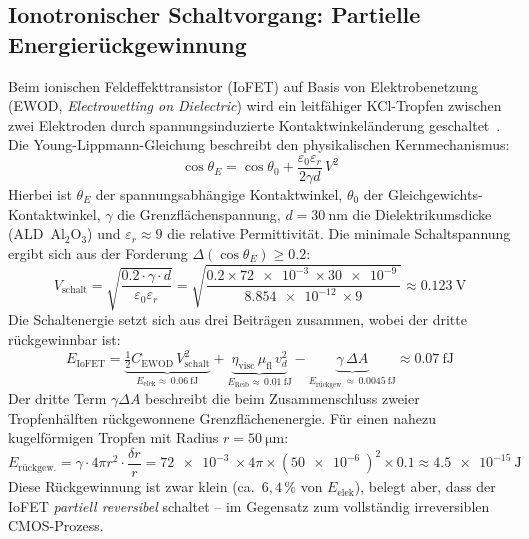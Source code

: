 ﻿\documentclass[12pt, a4paper]{report}
\theoremstyle{definition}
\theoremstyle{remark}
\begin{document}
\subsection{Ionotronischer Schaltvorgang: Partielle Energierückgewinnung}

Beim ionischen Feldeffekttransistor (IoFET) auf Basis von Elektrobenetzung
(EWOD, \emph{Electrowetting on Dielectric}) wird ein leitfähiger
KCl-Tropfen zwischen zwei Elektroden durch spannungsinduzierte
Kontaktwinkeländerung geschaltet~\cite{ionotronik2026}.
Die Young-Lippmann-Gleichung beschreibt den physikalischen Kernmechanismus:
\begin{equation}
  \cos\theta_E = \cos\theta_0
  + \frac{\varepsilon_0 \varepsilon_r}{2 \gamma d}\, V^2
  \label{eq:young_lippmann_thermo}
\end{equation}
Hierbei ist $\theta_E$ der spannungsabhängige Kontaktwinkel, $\theta_0$
der Gleichgewichts-Kontaktwinkel, $\gamma$ die Grenzflächenspannung,
$d = \SI{30}{\nano\metre}$ die Dielektrikumsdicke (ALD~Al$_2$O$_3$)
und $\varepsilon_r \approx 9$ die relative Permittivität.
Die minimale Schaltspannung ergibt sich aus der Forderung
$\Delta(\cos\theta_E) \geq 0.2$:
\begin{equation}
  V_\text{schalt}
  = \sqrt{\frac{0.2 \cdot \gamma \cdot d}{\varepsilon_0 \varepsilon_r}}
  = \sqrt{\frac{0.2 \times \SI{72e-3}{} \times \SI{30e-9}{}}%
              {\SI{8.854e-12}{} \times 9}}
  \approx \SI{0.123}{\volt}
  \label{eq:v_schalt_th}
\end{equation}
Die Schaltenergie setzt sich aus drei Beiträgen zusammen, wobei der
dritte rückgewinnbar ist:
\begin{equation}
  E_\text{IoFET}
  = \underbrace{\tfrac{1}{2}C_\text{EWOD}\,V_\text{schalt}^2}_{E_\text{elek}
    \approx\,\SI{0.06}{\femto\joule}}
  + \underbrace{\eta_\text{visc}\,\mu_\text{fl}\,v_d^2}_{E_\text{Reib}
    \approx\,\SI{0.01}{\femto\joule}}
  - \underbrace{\gamma\,\Delta A}_{E_\text{rückgew.}
    \approx\,\SI{0.0045}{\femto\joule}}
  \approx \SI{0.07}{\femto\joule}
  \label{eq:e_iofet}
\end{equation}
Der dritte Term $\gamma \Delta A$ beschreibt die beim Zusammenschluss zweier
Tropfenhälften rückgewonnene Grenzflächenenergie. Für einen nahezu
kugelförmigen Tropfen mit Radius $r = \SI{50}{\micro\metre}$:
\begin{equation}
  E_\text{rückgew.}
  = \gamma \cdot 4\pi r^2 \cdot \frac{\delta r}{r}
  = \SI{72e-3}{} \times 4\pi \times (\SI{50e-6}{})^2 \times 0.1
  \approx \SI{4.5e-15}{\joule}
  \label{eq:e_ruckgew}
\end{equation}
Diese Rückgewinnung ist zwar klein (ca.\ $6{,}4\,\%$ von
$E_\text{elek}$), belegt aber, dass der IoFET \emph{partiell reversibel}
schaltet -- im Gegensatz zum vollständig irreversiblen CMOS-Prozess.
\end{document}
